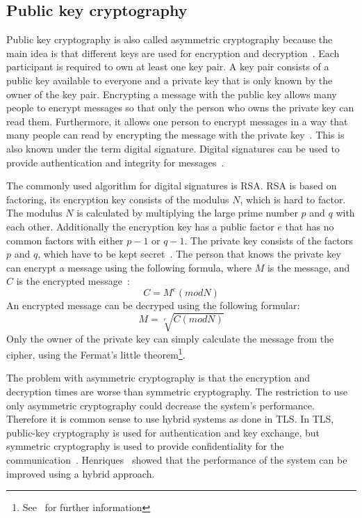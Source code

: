 \subsection{Public key cryptography}
Public key cryptography is also called asymmetric cryptography because the main idea is that different keys are used for encryption and decryption~\cite{anderson2020security}.
Each participant is required to own at least one key pair.
A key pair consists of a public key available to everyone and a private key that is only known by the owner of the key pair.
Encrypting a message with the public key allows many people to encrypt messages so that only the person who owns the private key can read them.
Furthermore, it allows one person to encrypt messages in a way that many people can read by encrypting the message with the private key~\cite{henriques2017using}.
This is also known under the term digital signature. 
Digital signatures can be used to provide authentication and integrity for messages~\cite{anderson2020security}.

The commonly used algorithm for digital signatures is RSA.
RSA is based on factoring, its encryption key consists of the modulus $N$, which is hard to factor.
The modulus $N$ is calculated by multiplying the large prime number $p$ and $q$ with each other.
Additionally the encryption key has a public factor $e$ that has no common factors with either $p-1$ or $q-1$.
The private key consists of the factors $p$ and $q$, which have to be kept secret~\cite{anderson2020security}.
The person that knows the private key can encrypt a message using the following formula, where $M$ is the message, and $C$ is the encrypted message~\cite{anderson2020security}:
\begin{displaymath}
	C = M^e (mod N)
\end{displaymath}
An encrypted message can be decryped using the following formular:
\begin{displaymath}
	M = \sqrt[e]{C (mod N)}
\end{displaymath}
Only the owner of the private key can simply calculate the message from the cipher, using the Fermat's little theorem\footnote{See~\cite{fermatlittle} for further information}.

The problem with asymmetric cryptography is that the encryption and decryption times are worse than symmetric cryptography.
The restriction to use only asymmetric cryptography could decrease the system's performance.
Therefore it is common sense to use hybrid systems as done in TLS.
In TLS, public-key cryptography is used for authentication and key exchange, but symmetric cryptography is used to provide confidentiality for the communication~\cite{henriques2017using}.
Henriques~\cite{henriques2017using} showed that the performance of the system can be improved using a hybrid approach.

